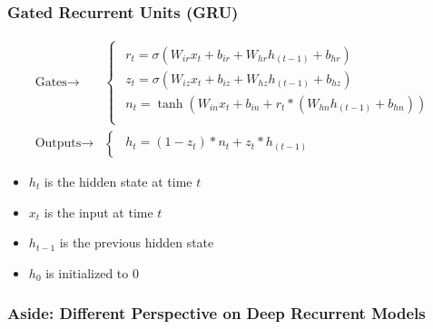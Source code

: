 \documentclass{beamer}
\begin{document}
\begin{frame}
\frametitle{Gated Recurrent Units (GRU)}
\begin{equation*}
  \begin{split}
  \text{Gates} \rightarrow & \begin{cases}
  \begin{array}{ll}
    r_t = \sigma(W_{ir} x_t + b_{ir} + W_{hr} h_{(t-1)} + b_{hr}) \\
    z_t = \sigma(W_{iz} x_t + b_{iz} + W_{hz} h_{(t-1)} + b_{hz}) \\
    n_t = \tanh(W_{in} x_t + b_{in} + r_t * (W_{hn} h_{(t-1)}+ b_{hn})) \\
  \end{array}
  \end{cases} \\
  \text{Outputs} \rightarrow & \begin{cases}
  \begin{array}{ll}
            h_t = (1 - z_t) * n_t + z_t * h_{(t-1)}
  \end{array}
\end{cases}
\end{split}
\end{equation*}
\begin{itemize}
  \item $h_t$ is the hidden state at time $t$
  \item $x_t$ is the input at time $t$
  \item $h_{t-1}$ is the previous hidden state
  \item $h_0$ is initialized to $0$
\end{itemize}

\end{frame}

\begin{frame}
\frametitle{Aside: Different Perspective on Deep Recurrent Models}
\end{frame}
\end{document}
